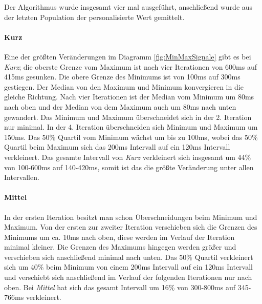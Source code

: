 
Der Algorithmus wurde insgesamt vier mal ausgef{\"u}hrt, anschlie{\ss}end wurde aus der letzten Population der personalisierte Wert gemittelt. 

\paragraph{Kurz}
Eine der gr{\"o}{\ss}ten Ver{\"a}nderungen im Diagramm \autoref{fig:MinMaxSignale} gibt es bei \textit{Kurz}; die oberste Grenze vom Maximum ist nach vier Iterationen von 600ms auf 415ms gesunken. 
Die obere Grenze des Minimums ist von 100ms auf 300ms gestiegen. 
Der Median von den Maximum und Minimum konvergieren in die gleiche Richtung. 
Nach vier Iterationen ist der Median vom Minimum um 80ms nach oben und der Median von dem Maximum auch um 80ms nach unten gewandert. 
Das Minimum und Maximum {\"u}berschneidet sich in der 2. Iteration nur minimal. 
In der 4. Iteration {\"u}berschneiden sich Minimum und Maximum um 150ms. 
Das 50\% Quartil vom Minimum w{\"a}chst um bis zu 100ms, wobei das 50\% Quartil beim Maximum sich das 200ms Intervall auf ein 120ms Intervall verkleinert. 
Das gesamte Intervall von \textit{Kurz} verkleinert sich insgesamt um 44\% von 100-600ms auf 140-420ms, somit ist das die gr{\"o}{\ss}te Ver{\"a}nderung unter allen Intervallen.



\paragraph{Mittel}
In der ersten Iteration besitzt man schon {\"U}berschneidungen beim Minimum und Maximum. 
Von der ersten zur zweiter Iteration verschieben sich die Grenzen des Minimums um ca. 10ms nach oben, diese werden im Verlauf der Iteration minimal kleiner.  
Die Grenzen des Maximums hingegen werden gr{\"o}{\ss}er und verschieben sich anschlie{\ss}end minimal nach unten. 
Das 50\% Quartil verkleinert sich um 40\% beim Minimum von einem 200ms Intervall auf ein 120ms Intervall und verschiebt sich anschlie{\ss}end im Verlauf der folgenden Iterationen nur nach oben. 
Bei \textit{Mittel} hat sich das gesamt Intervall um 16\% von 300-800ms auf 345-766ms verkleinert.


